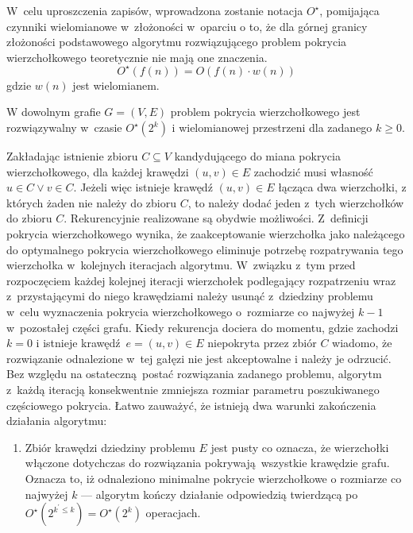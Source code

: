 \par{
  W~celu uproszczenia zapisów, wprowadzona zostanie notacja $O^{\star}$, pomijająca czynniki wielomianowe w~złożoności w~oparciu o to, że dla górnej granicy złożoności podstawowego algorytmu rozwiązującego problem pokrycia wierzchołkowego teoretycznie nie mają one znaczenia.
  \begin{equation*}
    O^{\star}(f(n))=O(f(n) \cdot w(n))
  \end{equation*}
  gdzie $w(n)$ jest wielomianem.

  \begin{theorem}
    W dowolnym grafie $G=(V, E)$ problem pokrycia wierzchołkowego jest rozwiązywalny w~czasie $O^{\star}(2^k)$ i wielomianowej przestrzeni dla zadanego $k \geq 0$.
  \end{theorem}
  \begin{bproof}
    Zakładając istnienie zbioru $C \subseteq V$ kandydującego do miana pokrycia wierzchołkowego, dla każdej krawędzi $(u, v) \in E$ zachodzić musi własność  $u \in C \lor v \in C$.
    Jeżeli więc istnieje krawędź $(u, v) \in E$ łącząca dwa wierzchołki, z których żaden nie należy do zbioru $C$, to należy dodać jeden z~tych wierzchołków do zbioru $C$.
    Rekurencyjnie realizowane są obydwie możliwości.
    Z~definicji pokrycia wierzchołkowego wynika, że zaakceptowanie wierzchołka jako należącego do optymalnego pokrycia wierzchołkowego eliminuje potrzebę rozpatrywania tego wierzchołka w~kolejnych iteracjach algorytmu.
    W~związku z~tym przed rozpoczęciem każdej kolejnej iteracji wierzchołek podlegający rozpatrzeniu wraz z~przystającymi do niego krawędziami należy usunąć z~dziedziny problemu w~celu wyznaczenia pokrycia wierzchołkowego o~rozmiarze co najwyżej $k-1$ w~pozostałej części grafu.
    Kiedy rekurencja dociera do momentu, gdzie zachodzi $k=0$ i istnieje krawędź $e=(u,v) \in E$ niepokryta przez zbiór $C$ wiadomo, że rozwiązanie odnalezione w~tej gałęzi nie jest akceptowalne i należy je odrzucić.
    Bez względu na ostateczną postać rozwiązania zadanego problemu, algorytm z~każdą iteracją konsekwentnie zmniejsza rozmiar parametru poszukiwanego częściowego pokrycia.
    Łatwo zauważyć, że istnieją dwa warunki zakończenia działania algorytmu:
    \begin{enumerate}
      \item Zbiór krawędzi dziedziny problemu $E$ jest pusty co oznacza, że wierzchołki włączone dotychczas do rozwiązania pokrywają wszystkie krawędzie grafu.
      Oznacza to, iż odnaleziono minimalne pokrycie wierzchołkowe o rozmiarze co najwyżej $k$ --- algorytm kończy działanie odpowiedzią twierdzącą po $O^\star(2^{k^\prime \leq k})=O^\star(2^k)$ operacjach.

\end{enumerate}
\end{bproof}}
